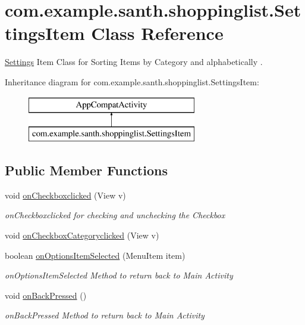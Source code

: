 \hypertarget{classcom_1_1example_1_1santh_1_1shoppinglist_1_1_settings_item}{}\section{com.\+example.\+santh.\+shoppinglist.\+Settings\+Item Class Reference}
\label{classcom_1_1example_1_1santh_1_1shoppinglist_1_1_settings_item}


\hyperlink{classcom_1_1example_1_1santh_1_1shoppinglist_1_1_settings}{Settings} Item Class for Sorting Items by Category and alphabetically .  


Inheritance diagram for com.\+example.\+santh.\+shoppinglist.\+Settings\+Item\+:\begin{figure}[H]
\begin{center}
\leavevmode
\includegraphics[height=2.000000cm]{classcom_1_1example_1_1santh_1_1shoppinglist_1_1_settings_item}
\end{center}
\end{figure}
\subsection*{Public Member Functions}
\begin{DoxyCompactItemize}
\item 
void \hyperlink{classcom_1_1example_1_1santh_1_1shoppinglist_1_1_settings_item_a00b529850ff39bbe22d3da46e90e66c2}{on\+Checkboxclicked} (View v)
\begin{DoxyCompactList}\small\item\em on\+Checkboxclicked for checking and unchecking the Checkbox \end{DoxyCompactList}\item 
void \hyperlink{classcom_1_1example_1_1santh_1_1shoppinglist_1_1_settings_item_a7ae7ab8742929196cd24a600445d854b}{on\+Checkbox\+Categoryclicked} (View v)
\item 
boolean \hyperlink{classcom_1_1example_1_1santh_1_1shoppinglist_1_1_settings_item_a034273c75ebd07c5987e1e94b3ac4e86}{on\+Options\+Item\+Selected} (Menu\+Item item)
\begin{DoxyCompactList}\small\item\em on\+Options\+Item\+Selected Method to return back to Main Activity \end{DoxyCompactList}\item 
void \hyperlink{classcom_1_1example_1_1santh_1_1shoppinglist_1_1_settings_item_aa6b7b31935f5b6237e29056168d2432b}{on\+Back\+Pressed} ()
\begin{DoxyCompactList}\small\item\em on\+Back\+Pressed Method to return back to Main Activity \end{DoxyCompactList}\end{DoxyCompactItemize}
